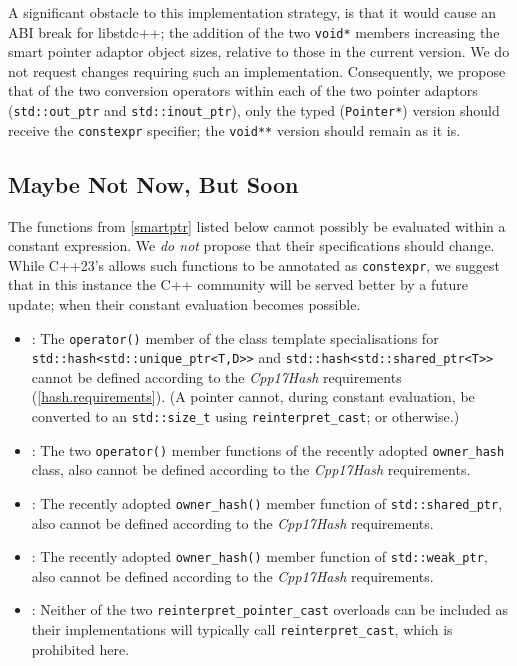 \documentclass[10pt]{article}
\newcommand*{\wgxxi}[1]{[\href{https://wg21.link/#1}{#1}]}
\begin{document}
A significant obstacle to this implementation strategy, is that it would cause
an ABI break for libstdc++; the addition of the two \texttt{void*} members
increasing the smart pointer adaptor object sizes, relative to those in the
current version. We do not request changes requiring such an implementation.
Consequently, we propose that of the two conversion operators within each of
the two pointer adaptors (\texttt{std::out\_ptr} and \texttt{std::inout\_ptr}),
only the typed (\texttt{Pointer*}) version should receive the
\texttt{constexpr} specifier; the \texttt{void**} version should remain as it
is.

\subsection{Maybe Not Now, But Soon}
\label{sec:mnnbs}

The functions from \wgxxi{smartptr} listed below cannot possibly be evaluated
within a constant expression. We \emph{do not} propose that their
specifications should change. While C++23's \cite{P2448R2} allows such
functions to be annotated as \texttt{constexpr}, we suggest that in this
instance the C++ community will be served better by a future update; when their
constant evaluation becomes possible.

\begin{itemize}
  \item \wgxxi{util.smartptr.hash}: The \texttt{operator()} member of the class template specialisations for \linebreak
\texttt{std::hash<std::unique\_ptr<T,D>}\texttt{>} and
\texttt{std::hash<std::shared\_ptr<T>}\texttt{>} cannot be defined according to the \emph{Cpp17Hash} requirements (\wgxxi{hash.requirements}). (A pointer cannot, during constant evaluation, be converted to an \texttt{std::size\_t} using \texttt{reinterpret\_cast}; or otherwise.)

  \item \wgxxi{util.smartptr.owner.hash}: The two \texttt{operator()} member functions of the recently adopted \texttt{owner\_hash} class, also cannot be defined according to the \emph{Cpp17Hash} requirements.

  \item \wgxxi{util.smartptr.shared.obs}: The recently adopted \texttt{owner\_hash()} member function of \texttt{std::shared\_ptr}, also cannot be defined according to the \emph{Cpp17Hash} requirements.

  \item \wgxxi{util.smartptr.weak.obs}: The recently adopted \texttt{owner\_hash()} member function of \texttt{std::weak\_ptr}, also cannot be defined according to the \emph{Cpp17Hash} requirements.

  \item \wgxxi{util.smartptr.shared.cast}: Neither of the two \texttt{reinterpret\_pointer\_cast} overloads can be included as their implementations will typically call \texttt{reinterpret\_cast}, which is prohibited here.

\end{itemize}
\end{document}
